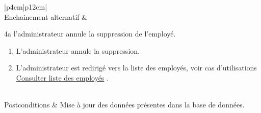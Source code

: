 \begin{longtable}{|p{4cm}|p{12cm}|}
                    \\
                    \hline
                    Enchainement alternatif & 
                    \begin{minipage}[t]{\linewidth}
                            4a l’administrateur annule la suppression de l'employé. \begin{enumerate}[nosep,after=\strut]
                                \item L’administrateur annule la suppression.
                                \item L’administrateur est redirigé vers la liste des employés, voir cas d’utilisations \underline{Consulter liste des employés} .
                            \end{enumerate}
                    \end{minipage}
                    \\
                    
                    \hline
                    Postconditions & Mise à jour des données présentes dans la base de données.
                    \\
                    \hline
                    \caption{Description du cas d'utilisation « Supprimer un employé »}\\
            \end{longtable}
        
